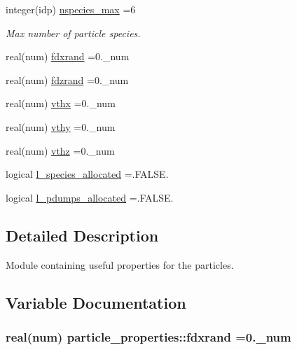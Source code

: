 \begin{DoxyCompactItemize}
integer(idp) \hyperlink{namespaceparticle__properties_a7f6d8f4edc23a026743320958d14d534}{nspecies\+\_\+max} =6
\begin{DoxyCompactList}\small\item\em Max number of particle species. \end{DoxyCompactList}\item 
real(num) \hyperlink{namespaceparticle__properties_a68abb05c88189b0d3f2ac02b0bde9d83}{fdxrand} =0.\+\_\+num
\item 
real(num) \hyperlink{namespaceparticle__properties_ac28362a40a4b808ff8ede4d94c4423f3}{fdzrand} =0.\+\_\+num
\item 
real(num) \hyperlink{namespaceparticle__properties_ab09cf3446a6f6d5cc0c600be909db8c1}{vthx} =0.\+\_\+num
\item 
real(num) \hyperlink{namespaceparticle__properties_a6edaa2cc58de2c03d2f9da281f25742a}{vthy} =0.\+\_\+num
\item 
real(num) \hyperlink{namespaceparticle__properties_a7826780fb51369556dcbf7bd63f1ef81}{vthz} =0.\+\_\+num
\item 
logical \hyperlink{namespaceparticle__properties_a3dcd8fa47e189305bb2534a72c4a8d5c}{l\+\_\+species\+\_\+allocated} =.F\+A\+L\+S\+E.
\item 
logical \hyperlink{namespaceparticle__properties_a5ab16464c3ac1b31175817e811763fe1}{l\+\_\+pdumps\+\_\+allocated} =.F\+A\+L\+S\+E.
\end{DoxyCompactItemize}


\subsection{Detailed Description}
Module containing useful properties for the particles. 

\subsection{Variable Documentation}
\subsubsection[{\texorpdfstring{fdxrand}{fdxrand}}]{\setlength{\rightskip}{0pt plus 5cm}real(num) particle\+\_\+properties\+::fdxrand =0.\+\_\+num}\hypertarget{namespaceparticle__properties_a68abb05c88189b0d3f2ac02b0bde9d83}{}\label{namespaceparticle__properties_a68abb05c88189b0d3f2ac02b0bde9d83}
